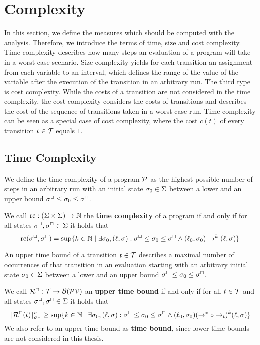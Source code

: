 \section{Complexity}

In this section, we define the measures which should be computed with the analysis.
Therefore, we introduce the terms of time, size and cost complexity.
Time complexity describes how many steps an evaluation of a program will take in a worst-case scenario.
Size complexity yields for each transition an assignment from each variable to an interval, which defines the range of the value of the variable after the execution of the transition in an arbitrary run.
The third type is cost complexity.
While the costs of a transition are not considered in the time complexity, the cost complexity considers the costs of transitions and describes the cost of the sequence of transitions taken in a worst-case run.
Time complexity can be seen as a special case of cost complexity, where the cost $c(t)$ of every transition $t \in \mathcal{T}$ equals $1$.

\subsection{Time Complexity}

We define the time complexity of a program $\mathcal{P}$ as the highest possible number of steps in an arbitrary run with an initial state $\sigma_0 \in \Sigma$ between a lower and an upper bound ${\sigma^\sqcup} \leq \sigma_0 \leq {\sigma^\sqcap}$.

\begin{definition}
  We call $\text{rc}: (\Sigma \times \Sigma) \rightarrow \mathbb{N}$ the \textbf{time complexity} of a program if and only if for all states ${\sigma^\sqcup}, {\sigma^\sqcap} \in \Sigma$ it holds that
  \[ \text{rc}({\sigma^\sqcup}, {\sigma^\sqcap}) = \sup \lbrace  k \in \mathbb{N} \mid \exists \sigma_0, (\ell, \sigma): {\sigma^\sqcup} \leq \sigma_0 \leq {\sigma^\sqcap} \wedge (\ell_0, \sigma_0) \rightarrow^k (\ell, \sigma)  \rbrace \]
\end{definition}

An upper time bound of a transition $t \in \mathcal{T}$ describes a maximal number of occurrences of that transition in an evaluation starting with an arbitrary initial state $\sigma_0 \in \Sigma$ between a lower and an upper bound ${\sigma^\sqcup} \leq \sigma_0 \leq {\sigma^\sqcap}$.

\begin{definition}
  We call ${\mathcal{R}^\sqcap}: \mathcal{T} \rightarrow \mathcal{B}(\mathcal{PV})$ an \textbf{upper time bound} if and only if for all $t \in \mathcal{T}$ and all states ${\sigma^\sqcup}, {\sigma^\sqcap} \in \Sigma$ it holds that
  \[ \lceil {\mathcal{R}^\sqcap}(t) \rceil^{{\sigma^\sqcap}}_{{\sigma^\sqcup}} \geq \sup \lbrace  k \in \mathbb{N} \mid \exists \sigma_0, (\ell, \sigma): {\sigma^\sqcup} \leq \sigma_0 \leq {\sigma^\sqcap} \wedge (\ell_0, \sigma_0) (\rightarrow^* \circ \rightarrow_t)^k (\ell, \sigma)  \rbrace \]
  We also refer to an upper time bound as \textbf{time bound}, since lower time bounds are not considered in this thesis.
\end{definition}

